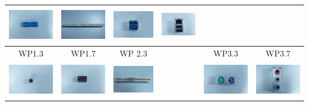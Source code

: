\documentclass[journal]{IEEEtran}
\begin{document}
\begin{table}[!t]
\begin{center}
\begin{tabular}{|c|c||c|c||c|c|}
\includegraphics[width=1in,height=0.6in]{j_img/wp22.jpg} & 
\includegraphics[width=1in,height=0.6in]{j_img/wp26.jpg} &
\includegraphics[width=1in,height=0.6in]{j_img/wp32.jpg} & 
\includegraphics[width=1in,height=0.6in]{j_img/wp36.jpg} 
\\
\hline
WP1.3 & WP1.7 & WP 2.3 & & WP3.3 & WP3.7\\
\hline
\includegraphics[width=1in,height=0.6in]{j_img/wp13.jpg} & 
\includegraphics[width=1in,height=0.6in]{j_img/wp17.jpg} & 
\includegraphics[width=1in,height=0.6in]{j_img/wp23.jpg} & 
 &
\includegraphics[width=1in,height=0.6in]{j_img/wp33.jpg} & 
\includegraphics[width=1in,height=0.6in]{j_img/wp37.jpg} 
\\

\end{tabular}
\end{center}
\end{table}
\end{document}
